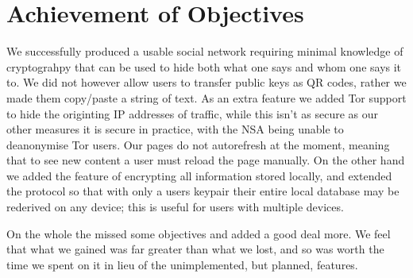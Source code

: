 \section{Achievement of Objectives}
We successfully produced a usable social network requiring minimal knowledge of
cryptograhpy that can be used to hide both what one says and whom one says it
to. We did not however allow users to transfer public keys as QR codes, rather
we made them copy/paste a string of text. As an extra feature we added Tor
support to hide the originting IP addresses of traffic, while this isn't as
secure as our other measures it is secure in practice, with the NSA being unable
to deanonymise Tor users\cite{torStinks}. Our pages do not autorefresh at the
moment, meaning that to see new content a user must reload the page manually.
On the other hand we added the feature of encrypting all information stored
locally, and extended the protocol so that with only a users keypair their
entire local database may be rederived on any device; this is useful for users
with multiple devices.


On the whole the missed some objectives and added a good deal more. We feel that
what we gained was far greater than what we lost, and so was worth the time we
spent on it in lieu of the unimplemented, but planned, features.
